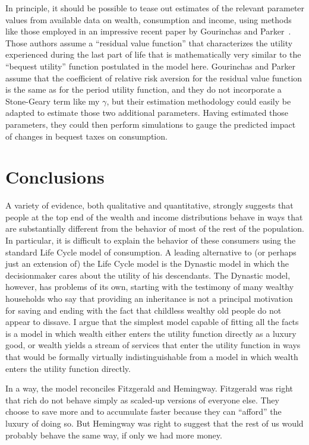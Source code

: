 \documentclass[titlepage,12pt]{article}
\begin{document}
In principle, it should be possible to tease out estimates of the 
relevant parameter values from available data on wealth, consumption 
and income, using methods like those employed in an impressive recent 
paper by Gourinchas and Parker~\cite{gpLifeCycle}.  
Those authors assume a ``residual value function'' that characterizes 
the utility experienced during the last part of life that is 
mathematically very similar to the ``bequest utility'' function 
postulated in the model here.  Gourinchas and Parker assume that the 
coefficient of relative risk aversion for the residual value function 
is the same as for the period utility function, and they do not 
incorporate a Stone-Geary term like my $\gamma$, but their estimation 
methodology could easily be adapted to estimate those two additional 
parameters.  Having estimated those parameters, they could then 
perform simulations to gauge the predicted impact of changes in 
bequest taxes on consumption.  

\hypertarget{conclusion}{}
\section{Conclusions}
A variety of evidence, both qualitative and quantitative, strongly 
suggests that people at the top end of the wealth and income 
distributions behave in ways that are substantially different from the 
behavior of most of the rest of the population.  In particular, it is 
difficult to explain the behavior of these consumers using the 
standard Life Cycle model of consumption.  A leading alternative to 
(or perhaps just an extension of) the Life Cycle model is the Dynastic 
model in which the decisionmaker cares about the utility of his 
descendants.  The Dynastic model, however, has problems of its own, 
starting with the testimony of many wealthy households who say that 
providing an inheritance is not a principal motivation for saving and 
ending with the fact that childless wealthy old people do not appear to 
dissave.  I argue that the simplest model capable of fitting all the 
facts is a model in which wealth either enters the utility function 
directly as a luxury good, or wealth yields a stream of services that 
enter the utility function in ways that would be formally virtually 
indistinguishable from a model in which wealth enters the utility 
function directly.

In a way, the model reconciles Fitzgerald and Hemingway.  Fitzgerald 
was right that rich do not behave simply as scaled-up versions of 
everyone else.  They choose to save more and to accumulate faster 
because they can ``afford'' the luxury of doing so.  But Hemingway was 
right to suggest that the rest of us would probably behave the same 
way, if only we had more money.
\end{document}
